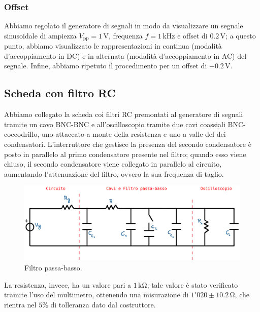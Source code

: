 \documentclass{article}
\begin{document}
			\subsubsection{Offset}
				Abbiamo regolato il generatore di segnali in modo da visualizzare un segnale sinusoidale di ampiezza $ V_{\mathrm{pp}} = 1 \, \mathrm{V} $, frequenza $ f = 1 \, \mathrm{kHz} $ e offset di $ 0.2 \, \mathrm{V} $; a questo punto, abbiamo visualizzato le rappresentazioni in continua (modalità d'accoppiamento in DC) e in alternata (modalità d'accoppiamento in AC) del segnale.
				\newline
				Infine, abbiamo ripetuto il procedimento per un offset di $ - 0.2 \, \mathrm{V} $.
		\subsection{Scheda con filtro RC}
			Abbiamo collegato la scheda coi filtri RC premontati al generatore di segnali tramite un cavo BNC-BNC e all'oscilloscopio tramite due cavi coassiali BNC-coccodrillo, uno attaccato a monte della resistenza e uno a valle del dei condensatori.
			\newline
			L'interruttore che gestisce la presenza del secondo condensatore è posto in parallelo al primo condensatore presente nel filtro; quando esso viene chiuso, il secondo condensatore viene collegato in parallelo al circuito, aumentando l'attenuazione del filtro, ovvero la sua frequenza di taglio.
			\begin{figure}[h!]
				\centering
				\includegraphics[scale=0.5]{circuitoFiltroPassaBasso}
				\caption{Filtro passa-basso.}
				\label{fig:circuitoFiltroPassaBasso}
			\end{figure}
			\newpage
			La resistenza, invece, ha un valore pari a $ 1 \, \mathrm{k\Omega} $; tale valore è stato verificato tramite l'uso del multimetro, ottenendo una misurazione di $ 1'020 \pm 10.2 \, \mathrm{\Omega} $, che rientra nel $ 5 \% $ di tolleranza dato dal costruttore.
\end{document}
